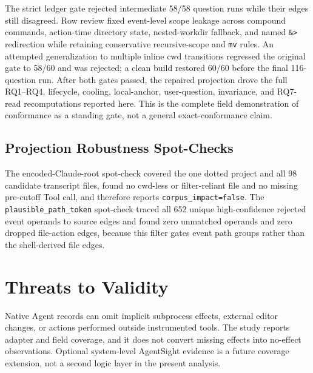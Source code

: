 \documentclass[letterpaper]{article}
\begin{document}
The strict ledger gate rejected intermediate 58/58 question runs while their
edges still disagreed.  Row review fixed event-level scope leakage across
compound commands, action-time directory state, nested-workdir fallback, and
named \texttt{\&>} redirection while retaining conservative recursive-scope
and \texttt{mv} rules.  An attempted generalization to multiple inline cwd
transitions regressed the original gate to 58/60 and was rejected; a clean
build restored 60/60 before the final 116-question run.  After both gates
passed, the repaired projection drove the full RQ1--RQ4, lifecycle, cooling,
local-anchor, user-question, invariance, and RQ7-read recomputations reported
here.  This is the complete field demonstration of conformance as a standing
gate, not a general exact-conformance claim.

\subsection{Projection Robustness Spot-Checks}

The encoded-Claude-root spot-check covered the one dotted project and all 98 candidate transcript files, found no cwd-less or filter-reliant file and no missing pre-cutoff Tool call, and therefore reports \texttt{corpus\_impact=false}.
The \texttt{plausible\_path\_token} spot-check traced all 652 unique high-confidence rejected event operands to source edges and found zero unmatched operands and zero dropped file-action edges, because this filter gates event path groups rather than the shell-derived file edges.

\section{Threats to Validity}

Native Agent records can omit implicit subprocess effects, external editor
changes, or actions performed outside instrumented tools.  The study reports
adapter and field coverage, and it does not convert missing effects into
no-effect observations.  Optional system-level AgentSight evidence is a future
coverage extension, not a second logic layer in the present analysis.
\end{document}
